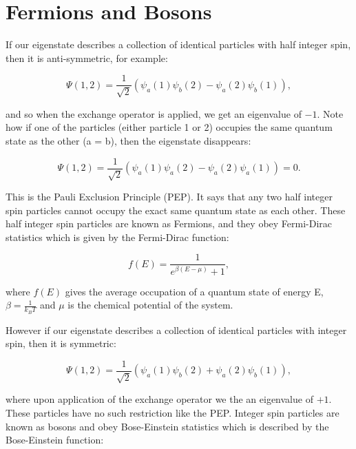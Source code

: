 \section{Fermions and Bosons}

If our eigenstate describes a collection of identical particles with half integer spin, then it is anti-symmetric, for example:

\begin{equation}
    \Psi (1, 2) = \frac{1}{\sqrt{2}} (\psi_a(1) \psi_b (2) - \psi_a (2) \psi_b (1)),
    \label{AntiSymmetricEigenfunction}
\end{equation}

\noindent and so when the exchange operator is applied, we get an eigenvalue of $-1$. Note how if one of the particles (either particle  1 or 2) occupies the same quantum state as the other (a = b), then the eigenstate disappears:

\begin{equation}
    \Psi (1, 2) = \frac{1}{\sqrt{2}} (\psi_a(1) \psi_a (2) - \psi_a (2) \psi_a (1)) = 0.
\end{equation}

\noindent This is the Pauli Exclusion Principle (PEP). It says that any two half integer spin particles cannot occupy the exact same quantum state as each other. These half integer spin particles are known as Fermions, and they obey Fermi-Dirac statistics which is given by the Fermi-Dirac function:

\begin{equation}
    f(E) = \frac{1}{e^{\beta (E - \mu)} + 1},
    \label{FermiDiracDistributionFunction}
\end{equation}

\noindent where $f(E)$ gives the average occupation of a quantum state of energy E, $\beta = \frac{1}{k_B T}$ and $\mu$ is the chemical potential of the system.

\noindent However if our eigenstate describes a collection of identical particles with integer spin, then it is symmetric:

\begin{equation}
    \Psi (1, 2) = \frac{1}{\sqrt{2}} (\psi_a(1) \psi_b (2) + \psi_a (2) \psi_b (1)),
    \label{SymmetricEigenfunction}
\end{equation}

\noindent where upon application of the exchange operator we the an eigenvalue of $+1$. These particles have no such restriction like the PEP. Integer spin particles are known as bosons and obey Bose-Einstein statistics which is described by the Bose-Einstein function:

